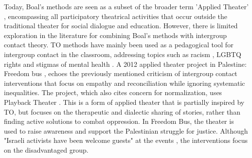 \documentclass[dissertation,math,vertlayout,pdfa,colorlinks]{aaltoseries}
\begin{document}
Today, Boal's methods are seen as a subset of the broader term 'Applied Theater' \cite{gjaerumAppliedTheatreResearch2013}, encompassing all participatory theatrical activities that occur outside the traditional theater for social dialogue and education. However, there is limited exploration in the literature for combining Boal's methods with intergroup contact theory. TO methods have mainly been used as a pedagogical tool for intergroup contact in the classroom, addressing topics such as racism \cite{abramsPrejudiceReductionCollective2012}, LGBTQ rights \cite{abramsPrejudiceReductionCollective2012,garciaOppressionPedagogyIntergroup2019} and stigmas of mental health \cite{nordstromVoicesProjectUsing2021}. A 2012 applied theater project in Palestine: Freedom bus \cite{riversNarrativePowerPlayback2015}, echoes the previously mentioned criticism of intergroup contact interventions that focus on empathy and reconciliation while ignoring systematic inequalities. The project, which also cites concern for normalization, uses Playback Theater \cite{sajnaniOpeningPlaybackTheatre2011}. This is a form of applied theater that is partially inspired by TO, but focuses on the therapeutic and dialectic sharing of stories, rather than finding active solutions to combat oppression. In Freedom Bus, the theater is used to raise awareness and support the Palestinian struggle for justice. Although "Israeli activists have been welcome guests" at the events \cite[p. 159]{riversNarrativePowerPlayback2015}, the interventions focus on the disadvantaged group. 
\end{document}
